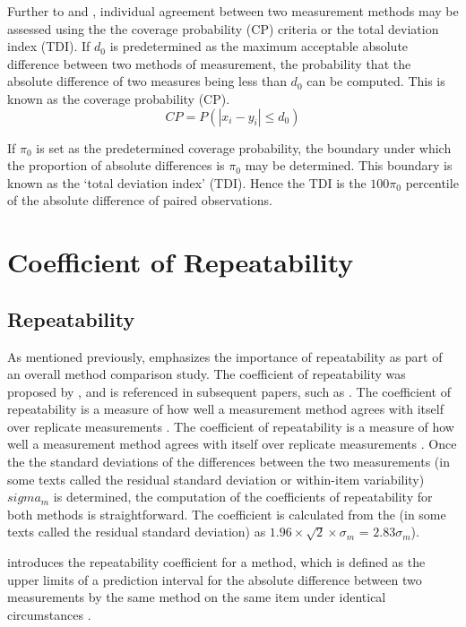 \documentclass[12pt, a4paper]{report}
\theoremstyle{plain}
\theoremstyle{definition}
\theoremstyle{remark}
\begin{document}
	Further to  \citet{lin2000} and \citet{lin2002}, individual agreement between two measurement methods may be
	assessed using the the coverage probability (CP) criteria or the total deviation index (TDI). If $d_{0}$ is predetermined as the maximum acceptable absolute difference between two methods of measurement, the probability that the absolute difference of two measures being less than $d_{0}$ can be computed. This is known as the coverage probability (CP).
	\begin{equation}
	CP = P(|x_{i} - y_{i}| \leq d_{0})
	\end{equation}
	
	If $\pi_{0}$ is set as the predetermined coverage probability, the
	boundary under which the proportion of absolute differences is
	$\pi_{0}$ may be determined. This boundary is known as the `total
	deviation index' (TDI). Hence the TDI is the $100\pi_{0}$
	percentile of the absolute difference of paired observations.
		

\section{Coefficient of Repeatability}
\subsection{Repeatability}
As mentioned previously, \citet{Barnhart} emphasizes the importance of repeatability as part of an overall method comparison study. The coefficient of repeatability was proposed by \citet{BA99}, and is referenced in subsequent papers, such as \citet{BXC2008}. The coefficient of repeatability is a measure of how well a
measurement method agrees with itself over replicate measurements
\citep{BA99}. The coefficient of repeatability is a measure of how well a
measurement method agrees with itself over replicate measurements
\citep{BA99}. Once the the standard deviations of the differences between the two measurements (in some texts called the residual standard deviation or within-item variability) $sigma_m$ is determined, the
computation of the coefficients of repeatability for both methods
is straightforward. The coefficient is calculated from the (in some texts called the residual standard deviation) as  $1.96 \times \sqrt{2} \times \sigma_m$ = $2.83 \sigma_m$).



\citet{BA99} introduces the repeatability coefficient for a method, which is defined as the upper limits of a prediction interval for the absolute difference between two measurements by the same
method on the same item under identical circumstances \citep{BXC2008}.
\end{document}
